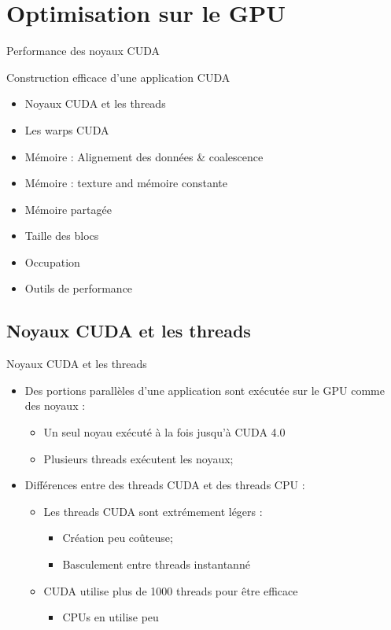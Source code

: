 \documentclass{beamer}
\begin{document}
\section{Optimisation sur le GPU}

\begin{frame}{Performance des noyaux CUDA}

\begin{center}\Large
Construction efficace d'une application CUDA
\end{center}

\begin{itemize}
\item Noyaux CUDA et les threads
\item Les warps CUDA
\item Mémoire : Alignement des données \& coalescence
\item Mémoire : texture and mémoire constante
\item Mémoire partagée
\item Taille des blocs
\item Occupation
\item Outils de performance
\end{itemize}
\end{frame}

\subsection{Noyaux CUDA et les threads}

\begin{frame}{Noyaux CUDA et les  threads}
\begin{itemize}
\item Des portions parallèles d'une application sont exécutée sur le GPU 
  comme des noyaux :
  \begin{itemize}
  \item Un seul noyau exécuté à la fois jusqu'à CUDA 4.0
  \item Plusieurs threads exécutent les noyaux;
  \end{itemize}
\item Différences entre des threads CUDA et des threads CPU :
  \begin{itemize}
  \item Les threads CUDA sont extrémement légers :
    \begin{itemize}
    \item Création peu coûteuse;
    \item Basculement entre threads instantanné
    \end{itemize}
  \item CUDA utilise plus de 1000 threads pour être efficace
    \begin{itemize}
    \item CPUs en utilise peu
    \end{itemize}
  \end{itemize}
\end{itemize}
\end{frame}
\end{document}
